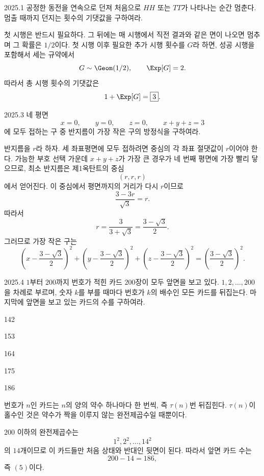 \begin{pastproblem}{2025.1}
공정한 동전을 연속으로 던져 처음으로 $HH$ 또는 $TT$가 나타나는 순간 멈춘다. 멈출 때까지 던지는 횟수의 기댓값을 구하여라.
\end{pastproblem}

\begin{solution}
첫 시행은 반드시 필요하다. 그 뒤에는 매 시행에서 직전 결과와 같은 면이 나오면 멈추며 그 확률은 $1/2$이다. 첫 시행 이후 필요한 추가 시행 횟수를 $G$라 하면, 성공 시행을 포함해서 세는 규약에서
\[
G\sim\Geom(1/2),\qquad \Exp[G]=2.
\]
따라서 총 시행 횟수의 기댓값은
\[
1+\Exp[G]=\boxed{3}.
\]
\end{solution}

\begin{pastproblem}{2025.3}
네 평면
\[
x=0,\qquad y=0,\qquad z=0,\qquad x+y+z=3
\]
에 모두 접하는 구 중 반지름이 가장 작은 구의 방정식을 구하여라.
\end{pastproblem}

\begin{solution}
반지름을 $r$라 하자. 세 좌표평면에 모두 접하려면 중심의 각 좌표 절댓값이 $r$이어야 한다. 가능한 부호 선택 가운데 $x+y+z$가 가장 큰 경우가 네 번째 평면에 가장 빨리 닿으므로, 최소 반지름은 제1옥탄트의 중심
\[
(r,r,r)
\]
에서 얻어진다. 이 중심에서 평면까지의 거리가 다시 $r$이므로
\[
\frac{3-3r}{\sqrt3}=r.
\]
따라서
\[
r=\frac3{3+\sqrt3}=\frac{3-\sqrt3}{2}.
\]
그러므로 가장 작은 구는
\[
\boxed{
\left(x-\frac{3-\sqrt3}{2}\right)^2+
\left(y-\frac{3-\sqrt3}{2}\right)^2+
\left(z-\frac{3-\sqrt3}{2}\right)^2
=\left(\frac{3-\sqrt3}{2}\right)^2}.
\]
\end{solution}

\begin{pastproblem}{2025.4}
$1$부터 $200$까지 번호가 적힌 카드 $200$장이 모두 앞면을 보고 있다. $1,2,\ldots,200$을 차례로 부르며, 숫자 $k$를 부를 때마다 번호가 $k$의 배수인 모든 카드를 뒤집는다. 마지막에 앞면을 보고 있는 카드의 수를 구하여라.
\begin{problemchoices}
\item 142
\item 153
\item 164
\item 175
\item 186
\end{problemchoices}
\end{pastproblem}

\begin{solution}
번호가 $n$인 카드는 $n$의 양의 약수 하나마다 한 번씩, 즉 $\tau(n)$번 뒤집힌다. $\tau(n)$이 홀수인 것은 약수가 짝을 이루지 않는 완전제곱수일 때뿐이다.

$200$ 이하의 완전제곱수는
\[
1^2,2^2,\ldots,14^2
\]
의 $14$개이므로 이 카드들만 처음 상태와 반대인 뒷면이 된다. 따라서 앞면 카드 수는
\[
200-14=\boxed{186},
\]
즉 $\boxed{(5)}$이다.
\end{solution}

